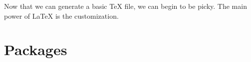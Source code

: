 \documentclass[]{article}
\begin{document}
Now that we can generate a basic TeX file, we can begin to be picky. The main power of LaTeX is the customization. 
\section{Packages}
\subsection{}
\subsection{}
\subsection{}
\end{document}
